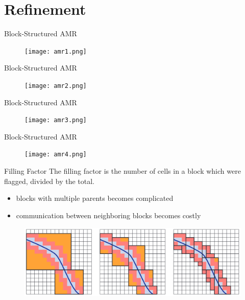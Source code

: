 \documentclass{beamer}
\begin{document}
\section{Refinement}

\begin{frame}{Block-Structured AMR}
    \begin{figure}
        \center
        \texttt{[image: amr1.png]}
    \end{figure}
\end{frame}

\begin{frame}{Block-Structured AMR}
    \begin{figure}
        \center
        \texttt{[image: amr2.png]}
    \end{figure}
\end{frame}

\begin{frame}{Block-Structured AMR}
    \begin{figure}
        \center
        \texttt{[image: amr3.png]}
    \end{figure}
\end{frame}

\begin{frame}{Block-Structured AMR}
    \begin{figure}
        \center
        \texttt{[image: amr4.png]}
    \end{figure}
\end{frame}

\begin{frame}{Filling Factor}
    The filling factor is the number of cells in a block which were flagged, divided by the total.
    \begin{itemize}
        \item<2-> blocks with multiple parents becomes complicated
        \item<3-> communication between neighboring blocks becomes costly
    \end{itemize}
    \begin{figure}
        \center
        \includegraphics[scale=0.18]{filling.png}
    \end{figure}
\end{frame}
\end{document}

